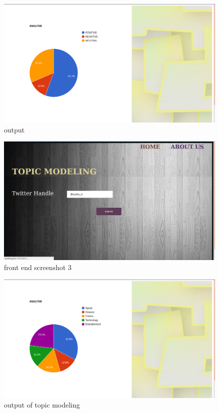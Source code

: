\begin{figure}
	\centering
	\includegraphics[width=0.8\linewidth]{new_out_sent.png}
	\caption{output}
	\label{types}
\end{figure}

\begin{figure}[h]
	\centering
	\includegraphics[width=0.9\linewidth]{sachin_topic.png}
	\caption{front end screenshot 3}
	\label{fig:expression01}
\end{figure}

\begin{figure}[h]
	\centering
	\includegraphics[width=0.9\linewidth]{sachin_topic_1.png}
	\caption{output of topic modeling}
	\label{fig:expression01}
\end{figure}


